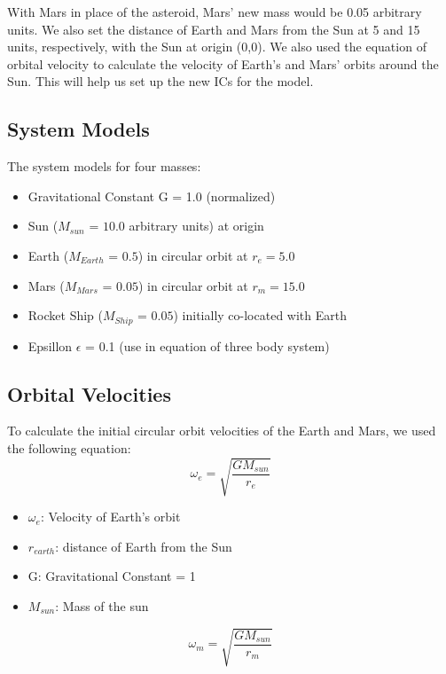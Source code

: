 \documentclass[12pt,a4paper,twocolumn,twoside]{tau-class/tau}
\begin{document}
    With Mars in place of the asteroid, Mars' new mass would be 0.05 arbitrary units. We also set the distance of Earth and Mars from the Sun at 5 and 15 units, respectively, with the Sun at origin (0,0). We also used the equation of orbital velocity to calculate the velocity of Earth's and Mars' orbits around the Sun. This will help us set up the new ICs for the model.

    \subsection{System Models}
    The system models for four masses: 
    \begin{itemize}
        \item Gravitational Constant G = 1.0 (normalized)
        \item Sun ($M_{sun}$ = $10.0$ arbitrary units) at origin
        \item Earth ($M_{Earth}$ = $0.5$) in circular orbit at $r_e = 5.0$
        \item Mars ($M_{Mars}$ = $0.05$) in circular orbit at $r_m = 15.0$
        \item Rocket Ship ($M_{Ship}$ = $0.05$) initially co-located with Earth
        \item Epsillon $\epsilon$ = 0.1 (use in equation of three body system)
    \end{itemize}
    
    \subsection{Orbital Velocities}
    To calculate the initial circular orbit velocities of the Earth and Mars, we used the following equation:
    \begin{equation}
    \omega_e = \sqrt{\frac{GM_{sun}}{r_{e}}}
    \label{eq:orbital_velocity}
\end{equation}

\begin{itemize}
    \item $\omega_e$: Velocity of Earth's orbit
\item $r_{earth}$: distance of Earth from the Sun

\item G: Gravitational Constant = 1
\item $M_{sun}$: Mass of the sun
\end{itemize}

\begin{equation}
    \omega_m = \sqrt{\frac{GM_{sun}}{r_{m}}}
    \label{eq:orbital_velocity}
\end{equation}
\end{document}
